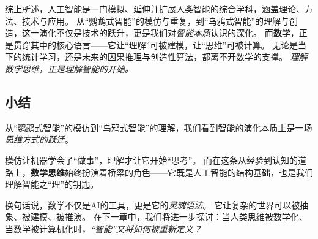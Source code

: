 
综上所述，人工智能是一门模拟、延伸并扩展人类智能的综合学科，涵盖理论、方法、技术与应用。
从“鹦鹉式智能”的模仿与重复，到“乌鸦式智能”的理解与创造，这一演化不仅是技术的跃升，更是我们对\emph{智能本质}认识的深化。
而\textbf{数学}，正是贯穿其中的核心语言——它让“理解”可被建模，让“思维”可被计算。
无论是当下的统计学习，还是未来的因果推理与创造性算法，都离不开数学的支撑。
\emph{理解数学思维，正是理解智能的开始。}

\subsection{小结}
从“鹦鹉式智能”的模仿到“乌鸦式智能”的理解，我们看到智能的演化本质上是一场\emph{思维方式的跃迁}。

模仿让机器学会了“做事”，理解才让它开始“思考”。
而在这条从经验到认知的道路上，\textbf{数学思维}始终扮演着桥梁的角色——它既是人工智能的结构基础，也是我们理解智能之“理”的钥匙。

换句话说，数学不仅是AI的工具，更是它的\emph{灵魂语法}。
它让复杂的世界可以被抽象、被建模、被推演。
在下一章中，我们将进一步探讨：当人类思维被数学化、当数学被计算机化时，\emph{“智能”又将如何被重新定义？}
\nocite{*}
\newpage